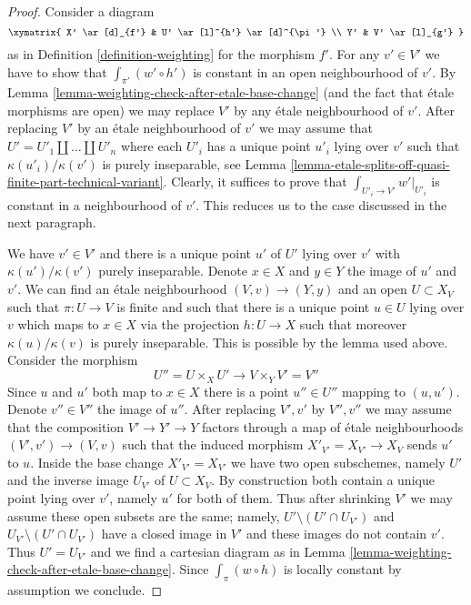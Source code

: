 \begin{proof}
Consider a diagram
$$
\xymatrix{
X' \ar[d]_{f'} & U' \ar[l]^{h'} \ar[d]^{\pi'} \\
Y' & V' \ar[l]_{g'}
}
$$
as in Definition \ref{definition-weighting} for the morphism $f'$.
For any $v' \in V'$ we have to show that $\int_{\pi'} (w' \circ h')$ is
constant in an open neighbourhood of $v'$. By
Lemma \ref{lemma-weighting-check-after-etale-base-change}
(and the fact that \'etale morphisms are open)
we may replace $V'$ by any \'etale neighbourhood of $v'$.
After replacing $V'$ by an \'etale neighbourhood of $v'$
we may assume that $U' = U'_1 \amalg \ldots \amalg U'_n$
where each $U'_i$ has a unique point $u'_i$ lying over $v'$
such that $\kappa(u'_i)/\kappa(v')$ is purely inseparable,
see Lemma \ref{lemma-etale-splits-off-quasi-finite-part-technical-variant}.
Clearly, it suffices to prove that $\int_{U'_i \to V'} w'|_{U'_i}$
is constant in a neighbourhood of $v'$.
This reduces us to the case discussed in the next paragraph.

\medskip\noindent
We have $v' \in V'$ and there is a unique point $u'$ of $U'$
lying over $v'$ with $\kappa(u')/\kappa(v')$ purely inseparable.
Denote $x \in X$ and $y \in Y$ the image of $u'$ and $v'$.
We can find an \'etale neighbourhood $(V, v) \to (Y, y)$
and an open $U \subset X_V$ such that $\pi : U \to V$ is finite
and such that there is a unique point $u \in U$ lying over $v$
which maps to $x \in X$ via the projection $h : U \to X$
such that moreover $\kappa(u)/\kappa(v)$ is
purely inseparable. This is possible by the lemma used above.
Consider the morphism
$$
U'' = U \times_X U' \longrightarrow V \times_Y V' = V''
$$
Since $u$ and $u'$ both map to $x \in X$ there is a point
$u'' \in U''$ mapping to $(u, u')$. Denote $v'' \in V''$
the image of $u''$. After replacing $V', v'$ by $V'', v''$ 
we may assume that the composition $V' \to Y' \to Y$ factors
through a map of \'etale neighbourhoods $(V', v') \to (V, v)$
such that the induced morphism $X'_{V'} = X_{V'} \to X_V$ sends
$u'$ to $u$. Inside the base change $X'_{V'} = X_{V'}$ we have
two open subschemes, namely $U'$ and the inverse image $U_{V'}$ of
$U \subset X_V$. By construction both contain a unique point lying
over $v'$, namely $u'$ for both of them.
Thus after shrinking $V'$ we may assume these open subsets
are the same; namely, $U' \setminus (U' \cap U_{V'})$ and
$U_{V'} \setminus (U' \cap U_{V'})$ have
a closed image in $V'$ and these images do not contain $v'$.
Thus $U' = U_{V'}$ and we find a cartesian diagram as in
Lemma \ref{lemma-weighting-check-after-etale-base-change}.
Since $\int_\pi (w \circ h)$ is locally constant
by assumption we conclude.
\end{proof}


